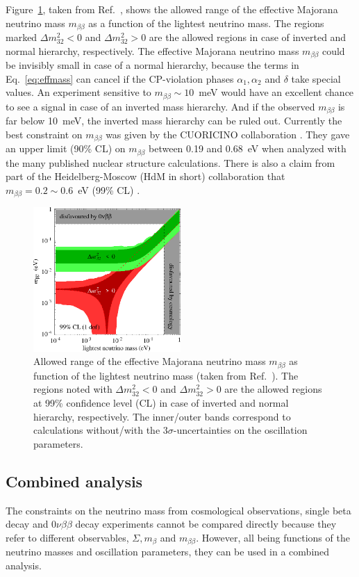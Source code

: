 Figure~\ref{fig:m2bVSlightest}, taken from Ref.~\cite{Str05}, shows
the allowed range of the effective Majorana neutrino mass
$m_{\beta\beta}$ as a function of the lightest neutrino mass. The
regions marked $\Delta m^{2}_{32}<0$ and $\Delta m^{2}_{32}>0$ are the
allowed regions in case of inverted and normal hierarchy,
respectively. The effective Majorana neutrino mass $m_{\beta\beta}$
could be invisibly small in case of a normal hierarchy, because the
terms in Eq.~\ref{eq:effmass} can cancel if the CP-violation phases
$\alpha_{1}, \alpha_{2}$ and $\delta$ take special values. An
experiment sensitive to $ m_{\beta\beta} \sim 10$~meV would have an
excellent chance to see a signal in case of an inverted mass
hierarchy. And if the observed $m_{\beta\beta}$ is far below 10~meV,
the inverted mass hierarchy can be ruled out. Currently the best
constraint on $m_{\beta\beta}$ was given by the CUORICINO
collaboration \cite{Cuo08}. They gave an upper limit (90\% CL) on
$m_{\beta\beta}$ between 0.19 and 0.68~eV when analyzed with the many
published nuclear structure calculations. There is also a claim from
part of the Heidelberg-Moscow (HdM in short) collaboration that
$m_{\beta\beta} = 0.2 \sim 0.6$~eV (99\% CL) \cite{Hei04}.
\begin{figure}[tbhp]
\centering
\includegraphics[width=0.5\textwidth]{m2bVSlightest}  
\caption{Allowed range of the effective Majorana neutrino mass
$m_{\beta\beta}$ as function of the lightest neutrino mass (taken from
Ref.~\cite{Str05}). The regions noted with $\Delta m^{2}_{32}<0$ and
$\Delta m^{2}_{32}>0$ are the allowed regions at 99\% confidence level
(CL) in case of inverted and normal hierarchy, respectively. The
inner/outer bands correspond to calculations without/with the $3
\sigma$-uncertainties on the oscillation parameters.}
\label{fig:m2bVSlightest}
\end{figure}

\subsection{Combined analysis}
\label{sec:joian}
The constraints on the neutrino mass from cosmological observations,
single beta decay and $0\nu\beta\beta$ decay experiments cannot be
compared directly because they refer to different observables,
$\Sigma, m_{\beta}$ and $m_{\beta\beta}$. However, all being functions
of the neutrino masses and oscillation parameters, they can be used in
a combined analysis.


